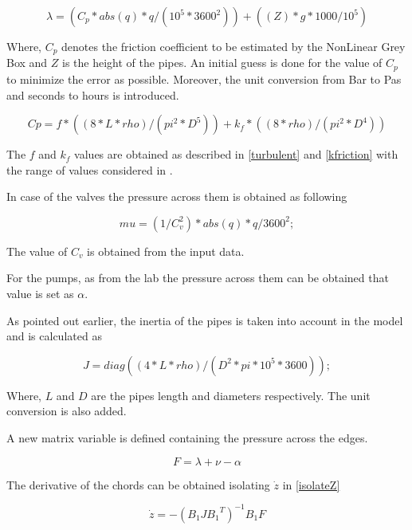 \begin{equation}
\lambda = (C_p * abs(q)*q /(10^5*3600^2)) + ((Z)*g*1000/10^5)
\end{equation}

Where, $C_p$ denotes the friction coefficient to be estimated by the NonLinear Grey Box and $Z$ is the height of the pipes. An initial guess is done for the value of $C_p$ to minimize the error 
as possible. Moreover, the unit conversion from Bar to Pas and seconds to hours is introduced.

\begin{equation}
  Cp= f*((8*L*rho)/(pi^2*D^5))+k_f*((8*rho)/(pi^2*D^4))
\end{equation}

The $f$ and $k_f$ values are obtained as described in \eqref{turbulent} and \eqref{kfriction} with the range of values considered in .

In case of the valves the pressure across them is obtained as following

\begin{equation}
  mu = (1/C_v^2)* abs(q)*q /3600^2;
\end{equation}

The value of $C_v$ is obtained from the input data. 

For the pumps, as from the lab the pressure across them can be obtained that value is set as $\alpha$. 

As pointed out earlier, the inertia of the pipes is taken into account in the model and is calculated as

\begin{equation}
  J = diag((4*L*rho)/(D^2*pi*10^5*3600));
\end{equation}

Where, $L$ and $D$ are the pipes length and diameters respectively. The unit conversion is also added. 

A new matrix variable is defined containing the pressure across the edges.

\begin{equation}
  F = \lambda + \nu - \alpha
\end{equation}

The derivative of the chords can be obtained isolating $\dot{z}$ in \eqref{isolateZ}

\begin{equation}
  \dot{z}  =  - (B_1 J {B_1}^T)^{-1}B_1 F
  \label{chordder}
\end{equation}

